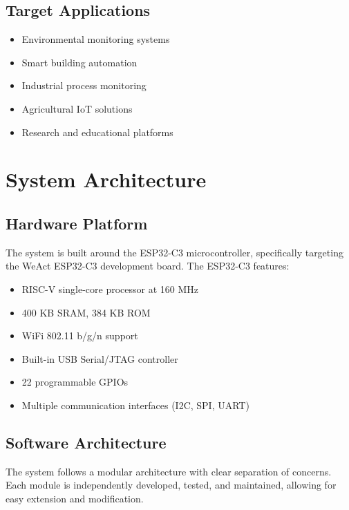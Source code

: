 \documentclass[12pt,a4paper]{article}
\begin{document}
\subsection{Target Applications}
\begin{itemize}
    \item Environmental monitoring systems
    \item Smart building automation
    \item Industrial process monitoring
    \item Agricultural IoT solutions
    \item Research and educational platforms
\end{itemize}

\section{System Architecture}

\subsection{Hardware Platform}
The system is built around the ESP32-C3 microcontroller, specifically targeting the WeAct ESP32-C3 development board. The ESP32-C3 features:

\begin{itemize}
    \item RISC-V single-core processor at 160 MHz
    \item 400 KB SRAM, 384 KB ROM
    \item WiFi 802.11 b/g/n support
    \item Built-in USB Serial/JTAG controller
    \item 22 programmable GPIOs
    \item Multiple communication interfaces (I2C, SPI, UART)
\end{itemize}

\subsection{Software Architecture}

The system follows a modular architecture with clear separation of concerns. Each module is independently developed, tested, and maintained, allowing for easy extension and modification.
\end{document}
